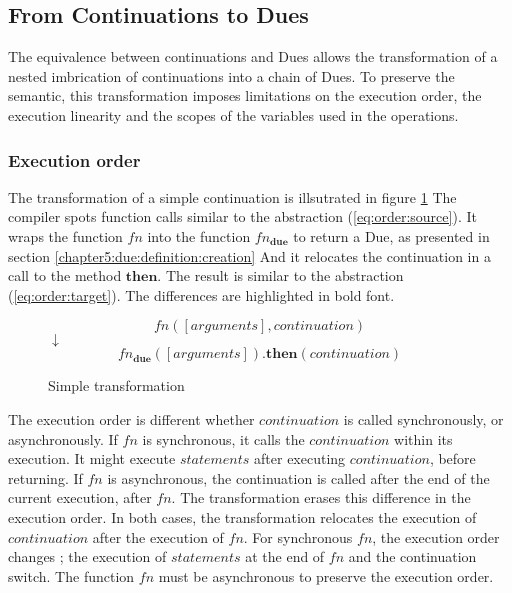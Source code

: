 \subsection{From Continuations to Dues} \label{chapter5:due:equivalence}

The equivalence between continuations and Dues allows the transformation of a nested imbrication of continuations into a chain of Dues.
To preserve the semantic, this transformation imposes limitations on the execution order, the execution linearity and the scopes of the variables used in the operations.

\subsubsection{Execution order}

The transformation of a simple continuation is illsutrated in figure \ref{fig:then-transform}
The compiler spots function calls similar to the abstraction (\ref{eq:order:source}).
It wraps the function $fn$ into the function $fn_\textbf{due}$ to return a Due, as presented in section \ref{chapter5:due:definition:creation}
And it relocates the continuation in a call to the method $\textbf{then}$.
The result is similar to the abstraction (\ref{eq:order:target}).
The differences are highlighted in bold font.

\begin{figure}[h!]
\centering
\begin{equation} \label{eq:order:source}
fn([arguments], continuation)
\end{equation}
$\downarrow$
\begin{equation} \label{eq:order:target}
fn_\textbf{due}([arguments])\textbf{.then}(continuation)
\end{equation}
\label{fig:then-transform}
\caption{Simple transformation}
\end{figure}

The execution order is different whether $continuation$ is called synchronously, or asynchronously.
If $fn$ is synchronous, it calls the $continuation$ within its execution.
It might execute $statements$ after executing $continuation$, before returning.
If $fn$ is asynchronous, the continuation is called after the end of the current execution, after $fn$.
The transformation erases this difference in the execution order.
In both cases, the transformation relocates the execution of $continuation$ after the execution of $fn$.
For synchronous $fn$, the execution order changes ; the execution of $statements$ at the end of $fn$ and the continuation switch.
The function $fn$ must be asynchronous to preserve the execution order.

